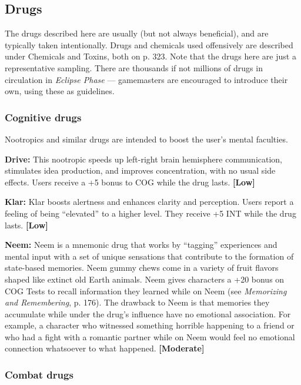 \subsection{Drugs} \label{sec:drugs} 

The drugs described here are usually (but not always beneficial), and are typically taken intentionally. Drugs and chemicals used offensively are described under Chemicals and Toxins, both on p. 323. Note that the drugs here are just a representative sampling. There are thousands if not millions of drugs in circulation in \emph{Eclipse Phase} --- gamemasters are encouraged to introduce their own, using these as guidelines. 

\subsubsection{Cognitive drugs} 

Nootropics and similar drugs are intended to boost the user’s mental faculties. 

\textbf{Drive:} This nootropic speeds up left-right brain hemisphere communication, stimulates idea production, and improves concentration, with no usual side effects. Users receive a +5 bonus to COG while the drug lasts. \textbf{[Low]} 

\textbf{Klar:} Klar boosts alertness and enhances clarity and perception. Users report a feeling of being ``elevated'' to a higher level. They receive +5 INT while the drug lasts. \textbf{[Low]} 

\textbf{Neem:} Neem is a mnemonic drug that works by ``tagging'' experiences and mental input with a set of unique sensations that contribute to the formation of state-based memories. Neem gummy chews come in a variety of fruit flavors shaped like extinct old Earth animals. Neem gives characters a +20 bonus on COG Tests to recall information they learned while on Neem (see \emph{Memorizing and Remembering}, p. 176). The drawback to Neem is that memories they accumulate while under the drug’s influence have no emotional association. For example, a character who witnessed something horrible happening to a friend or who had a fight with a romantic partner while on Neem would feel no emotional connection whatsoever to what happened. \textbf{[Moderate]} 

\subsubsection{Combat drugs} 

